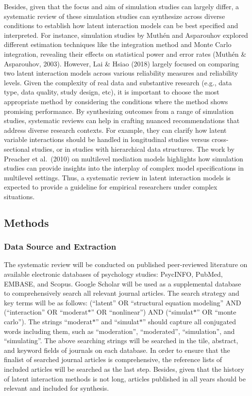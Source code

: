 \documentclass[
  man]{apa7}
\begin{document}
Besides, given that the focus and aim of simulation studies can largely differ, a systematic review of these simulation studies can synthesize across diverse conditions to establish how latent interaction models can be best specified and interpreted. For instance, simulation studies by Muthén and Asparouhov explored different estimation techniques like the integration method and Monte Carlo integration, revealing their effects on statistical power and error rates (Muthén \& Asparouhov, 2003). However, Lai \& Hsiao (2018) largely focused on comparing two latent interaction models across various reliability measures and reliability levels. Given the complexity of real data and substantive research (e.g., data type, data quality, study design, etc), it is important to choose the most appropriate method by considering the conditions where the method shows promising performance. By synthesizing outcomes from a range of simulation studies, systematic reviews can help in crafting nuanced recommendations that address diverse research contexts. For example, they can clarify how latent variable interactions should be handled in longitudinal studies versus cross-sectional studies, or in studies with hierarchical data structures. The work by Preacher et al.~(2010) on multilevel mediation models highlights how simulation studies can provide insights into the interplay of complex model specifications in multilevel settings. Thus, a systematic review in latent interaction models is expected to provide a guideline for empirical researchers under complex situations.

\hypertarget{methods}{%
\subsection{Methods}\label{methods}}

\hypertarget{data-source-and-extraction}{%
\subsubsection{Data Source and Extraction}\label{data-source-and-extraction}}

The systematic review will be conducted on published peer-reviewed literature on available electronic databases of psychology studies: PsycINFO, PubMed, EMBASE, and Scopus. Google Scholar will be used as a supplemental database to comprehensively search all relevant journal articles. The search strategy and key terms will be as follows: (``latent'' OR ``structural equation modeling'' AND (``interaction'' OR ``moderat\(\text{*}\)'' OR ``nonlinear'') AND (``simulat\(\text{*}\)'' OR ``monte carlo''). The strings ``moderat\(\text{*}\)'' and ``simulat\(\text{*}\)'' should capture all conjugated words including them, such as ``moderation'', ``moderated'', ``simulation'', and ``simulating''. The above searching strings will be searched in the tile, abstract, and keyword fields of journals on each database. In order to ensure that the finalist of searched journal articles is comprehensive, the reference lists of included articles will be searched as the last step. Besides, given that the history of latent interaction methods is not long, articles published in all years should be relevant and included for synthesis.
\end{document}
